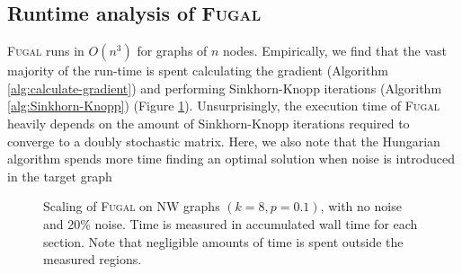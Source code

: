 \subsection{Runtime analysis of \textsc{Fugal}}
\textsc{Fugal} runs in $O(n^3)$ for graphs of $n$ nodes. Empirically, we find that the vast majority of the run-time is spent calculating the gradient (Algorithm \ref{alg:calculate-gradient}) and performing Sinkhorn-Knopp iterations (Algorithm \ref{alg:Sinkhorn-Knopp}) (Figure \ref{fig:fugal-scaling}). Unsurprisingly, the execution time of \textsc{Fugal} heavily depends on the amount of Sinkhorn-Knopp iterations required to converge to a doubly stochastic matrix. Here, we also note that the Hungarian algorithm spends more time finding an optimal solution when noise is introduced in the target graph\\

\fsNSW

\begin{figure}
    \centering
{}
    \caption{Scaling of \textsc{Fugal} on NW graphs $(k = 8, p = 0.1)$, with no noise and 20\% noise. Time is measured in accumulated wall time for each section. Note that negligible amounts of time is spent outside the measured regions.}
    \label{fig:fugal-scaling}
\end{figure}
